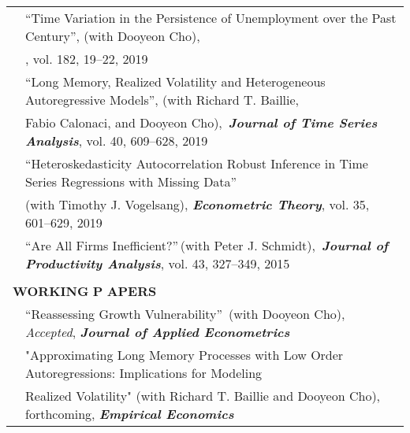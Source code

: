 \documentclass[10pt]{article}
\begin{document}
\begin{center}
\begin{tabular}{llllr}
& \multicolumn{4}{l}{\textquotedblleft Time Variation in the Persistence of Unemployment over the Past Century\textquotedblright, (with Dooyeon Cho),}\\
 & \multicolumn{4}{l}{\hspace{0.2cm}{\bf\emph{Economics Letters}}, vol. 182, 19--22, 2019}  \vspace{0.1cm}\\
& \multicolumn{4}{l}{\textquotedblleft  Long Memory, Realized Volatility and Heterogeneous Autoregressive Models\textquotedblright, (with Richard T. Baillie,}\\
& \multicolumn{4}{l}{\hspace{0.2cm} Fabio Calonaci, and Dooyeon Cho),\, \emph{{\bf\emph{Journal of Time Series Analysis}}}, vol. 40, 609--628, 2019} \vspace{0.1cm}\\
 & \multicolumn{4}{l}{\textquotedblleft Heteroskedasticity Autocorrelation Robust Inference in Time Series Regressions with Missing Data\textquotedblright \ } \\
& \multicolumn{4}{l}{\hspace{0.2cm}(with Timothy J. Vogelsang), \emph{{\bf\emph {Econometric Theory}}}, vol. 35, 601--629, 2019}  \vspace{0.1cm}\\
& \multicolumn{4}{l}{\textquotedblleft Are All Firms Inefficient?\textquotedblright \,(with Peter J. Schmidt),\, {\bf\emph{Journal of Productivity Analysis}}, vol. 43, 327--349, 2015 } \\
\multicolumn{5}{p{460pt}}{}\\
\multicolumn{5}{l}{{\Large \textbf{W}}\textbf{ORKING} {\Large \textbf{P}}%
\textbf{APERS}} \vspace{0.1cm}\\
& \multicolumn{4}{l}{\textquotedblleft Reassessing Growth Vulnerability\textquotedblright \ (with Dooyeon Cho), \emph{Accepted}, {\bf\emph {Journal of Applied Econometrics}}} \vspace{0.1cm}\\
& \multicolumn{4}{l}{"Approximating Long Memory Processes with Low Order Autoregressions: Implications for Modeling}\vspace{0.1cm}\\
& \multicolumn{4}{l}{ Realized Volatility" (with Richard T. Baillie and Dooyeon Cho), forthcoming, {\bf \emph{Empirical Economics}}} \vspace{0.1cm}\\

\end{tabular}
\end{center}
\end{document}
